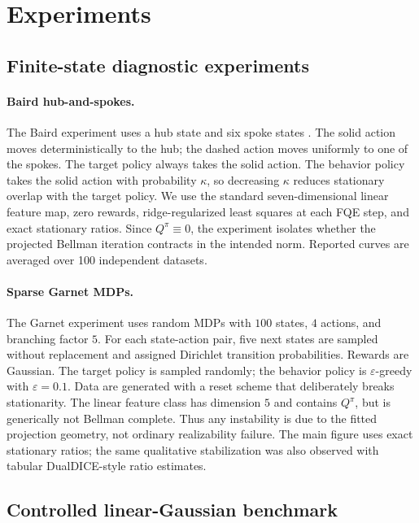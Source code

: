 \section{Experiments}
\label{sec::appendix}

\subsection{Finite-state diagnostic experiments}

\paragraph{Baird hub-and-spokes.}
The Baird experiment uses a hub state and six spoke states
\citep{baird1995residual}. The solid action moves deterministically to the hub;
the dashed action moves uniformly to one of the spokes. The target policy always
takes the solid action. The behavior policy takes the solid action with
probability \(\kappa\), so decreasing \(\kappa\) reduces stationary overlap with
the target policy. We use the standard seven-dimensional linear feature map,
zero rewards, ridge-regularized least squares at each FQE step, and exact
stationary ratios. Since \(Q^\pi\equiv0\), the experiment isolates whether the
projected Bellman iteration contracts in the intended norm. Reported curves are
averaged over 100 independent datasets.

\paragraph{Sparse Garnet MDPs.}
The Garnet experiment uses random MDPs with \(100\) states, \(4\) actions, and
branching factor \(5\). For each state-action pair, five next states are sampled
without replacement and assigned Dirichlet transition probabilities. Rewards
are Gaussian. The target policy is sampled randomly; the behavior policy is
\(\varepsilon\)-greedy with \(\varepsilon=0.1\). Data are generated with a reset
scheme that deliberately breaks stationarity. The linear feature class has
dimension \(5\) and contains \(Q^\pi\), but is generically not Bellman complete.
Thus any instability is due to the fitted projection geometry, not ordinary
realizability failure. The main figure uses exact stationary ratios; the same
qualitative stabilization was also observed with tabular DualDICE-style ratio
estimates.

\subsection{Controlled linear-Gaussian benchmark}

